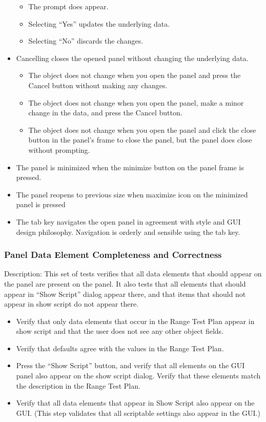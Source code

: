 \begin{itemize}
\begin{itemize}
\item The prompt does appear.
\item Selecting ``Yes'' updates the underlying data.
\item Selecting ``No'' discards the changes.
\end{itemize}
\item Cancelling closes the opened panel without changing the underlying data.
\begin{itemize}
\item The object does not change when you open the panel and press the Cancel button without making
any changes.
\item The object does not change when you open the panel, make a minor change in the data, and press
the Cancel button.
\item The object does not change when you open the panel and click the close button in the panel's
frame to close the panel, but the panel does close without prompting.
\end{itemize}
\item The panel is minimized when the minimize button on the panel frame is pressed.
\item The panel reopens to previous size when maximize icon on the minimized panel is pressed
\item The tab key navigates the open panel in agreement with style and GUI design philosophy. 
Navigation is orderly and sensible using the tab key.
\end{itemize}

\subsubsection{Panel Data Element Completeness and Correctness}

Description: This set of tests verifies that all data elements that should appear on the panel
are present on the panel.  It also tests that all elements that should appear in ``Show Script''
dialog appear there, and that items that should not appear in show script do not appear there.

\begin{itemize}
\item Verify that only data elements that occur in the Range Test Plan appear in show script and
that the user does not see any other object fields.
\item Verify that defaults agree with the values in the Range Test Plan.
\item Press the ``Show Script'' button, and verify that all elements on the GUI panel also appear on
the show script dialog.  Verify that these elements match the description in the Range Test Plan.
\item  Verify that all data elements that appear in Show Script also appear on the GUI.  (This
step validates that all scriptable settings also appear in the GUI.)
\end{itemize}
